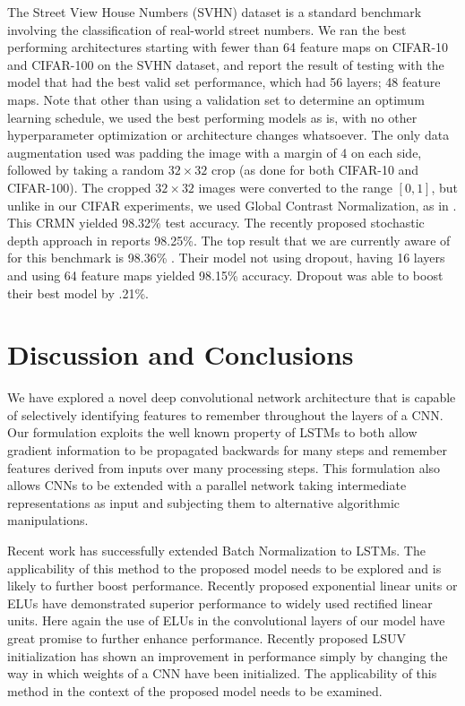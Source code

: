 \documentclass{article}
\begin{document}
The Street View House Numbers\cite{netzer2011reading} (SVHN) dataset is a standard benchmark involving the classification of real-world street numbers.  We ran the best performing architectures starting with fewer than 64 feature maps on CIFAR-10 and CIFAR-100 on the SVHN dataset, and report the result of testing with the model that had the best valid set performance, which had 56 layers; 48 feature maps. Note that other than using a validation set to determine an optimum learning schedule, we used the best performing models as is, with no other hyperparameter optimization or architecture changes whatsoever.
The only data augmentation used was padding the image with a margin of 4 on each side, followed by taking a random \(32\times32\) crop (as done for both CIFAR-10 and CIFAR-100). The cropped \(32\times32\) images were converted to the range \([0, 1]\), but unlike in our CIFAR experiments, we used Global Contrast Normalization, as in \cite{goodfellow2013multi}. This CRMN yielded 98.32\% test accuracy.
The recently proposed stochastic depth approach in \cite{huang2016deep} reports %
98.25\%.
The top result that we are currently aware of for this benchmark is 98.36\% \cite{zagoruyko2016wide}. Their model not using dropout, having 16 layers and using 64 feature maps yielded 98.15\% accuracy. Dropout was able to boost their best model by .21\%.

\section{Discussion and Conclusions}

We have explored a novel deep convolutional network architecture that is capable of selectively identifying features to remember throughout the layers of a CNN. Our formulation exploits the well known property of LSTMs to both allow gradient information to be propagated backwards for many steps and remember features derived from inputs over many processing steps. This formulation also allows CNNs to be extended with a parallel network taking intermediate representations as input and subjecting them to alternative algorithmic manipulations.

Recent work \cite{DBLP:journals/corr/CooijmansBLC16} has successfully extended Batch Normalization to LSTMs. The applicability of this method to the proposed model needs to be explored and is likely to further boost performance.
%
Recently proposed exponential linear units or ELUs \cite{clevert2015fast} have demonstrated superior performance to widely used rectified linear units. Here again the use of ELUs in the convolutional layers of our model have great promise to further enhance performance.
%
Recently proposed LSUV initialization \cite{DBLP:journals/corr/MishkinM15} has shown an improvement in performance simply by changing the way in which weights of a CNN have been initialized. The applicability of this method in the context of the proposed model needs to be examined.
\end{document}
